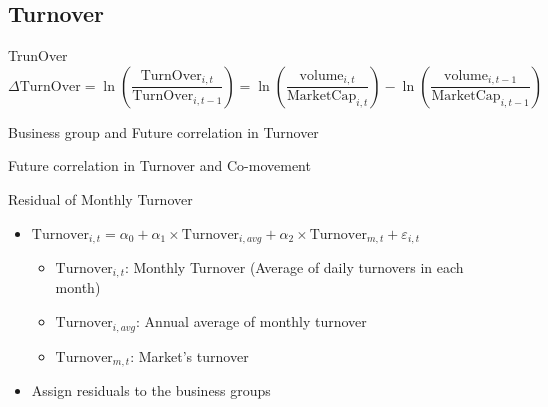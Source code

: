 \documentclass[handout]{beamer}
\begin{document}
 \subsection{Turnover}
	\begin{frame}{TrunOver}{\cite{Liquidity2016}}
		\begin{equation*}
			\Delta \text{TurnOver} = \ln(\frac{\text{TurnOver}_{i,t}}{\text{TurnOver}_{i,t-1}}) = 
			\ln({\frac{\text{volume}_{i,t}}{\text{MarketCap}_{i,t}}}) - \ln({\frac{\text{volume}_{i,t-1}}{\text{MarketCap}_{i,t-1}}})
		\end{equation*}


	\begin{table}[htbp]
		\centering
		\resizebox{0.55\textwidth}{!}{
			
		}
	\end{table}
	
\end{frame}


\begin{frame}{Business group and Future correlation in Turnover}
	\begin{table}[htbp]
		\centering
		\resizebox{\textwidth}{!}{
			\centering
			
		}
	\end{table}
\end{frame}

\begin{frame}{Future correlation in Turnover and Co-movement}
\begin{table}[htbp]
	\centering
	\resizebox{\textwidth}{!}{
		\centering
		
	}
\end{table}
\end{frame}

\begin{frame}{Residual of Monthly Turnover}
\begin{itemize}
\item $ \text{Turnover}_{i,t} = \alpha_0 +\alpha_1 \times \text{Turnover}_{i,avg} +\alpha_2 \times \text{Turnover}_{m,t} + \boxed{\varepsilon_{i,t}} $
\begin{itemize}\scriptsize
\item $ \text{Turnover}_{i,t}$: Monthly Turnover (Average of daily turnovers in each month)
\item $ \text{Turnover}_{i,avg}$: Annual average of monthly turnover
\item $ \text{Turnover}_{m,t}$: Market's turnover 

\end{itemize}
\item Assign residuals to the business groups
\bigskip

	\begin{table}[htbp]
		\centering
		\resizebox{0.75\textwidth}{!}{
			
		}
		\label{tab:ResidualTrunSummary}
	\end{table}
\end{itemize}
\end{frame}
\end{document}
